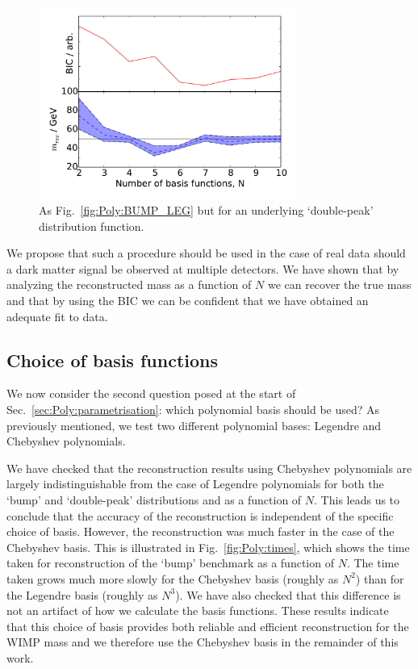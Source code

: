 \begin{figure}[t]
\centering
  \includegraphics[width=0.75\textwidth]{Poly/VaryingN_DP_LEG.pdf}
  \caption{As Fig.~\ref{fig:Poly:BUMP_LEG} but for an underlying `double-peak' distribution function.}
  \label{fig:Poly:DP_LEG}
\end{figure}

We propose that such a procedure should be used in the case of real data should a dark matter signal be observed at multiple detectors. We have shown that by analyzing the reconstructed mass as a function of $N$ we can recover the true mass and that by using the BIC we can be confident that we have obtained an adequate fit to data.

\subsection{Choice of basis functions}

We now consider the second question posed at the start of Sec.~\ref{sec:Poly:parametrisation}: which polynomial basis should be used? As previously mentioned, we test two different polynomial bases: Legendre and Chebyshev polynomials. 

We have checked that the reconstruction results using Chebyshev polynomials are largely indistinguishable from the case of Legendre polynomials for both the `bump' and `double-peak' distributions and as a function of $N$. This leads us to conclude that the accuracy of the reconstruction is independent of the specific choice of basis. However, the reconstruction was much faster in the case of the Chebyshev basis. This is illustrated in Fig.~\ref{fig:Poly:times}, which shows the time taken for reconstruction of the `bump' benchmark as a function of $N$. The time taken grows much more slowly for the Chebyshev basis (roughly as $N^2$) than for the Legendre basis (roughly as $N^3$). We have also checked that this difference is not an artifact of how we calculate the basis functions. These results indicate that this choice of basis provides both reliable and efficient reconstruction for the WIMP mass and we therefore use the Chebyshev basis in the remainder of this work.

